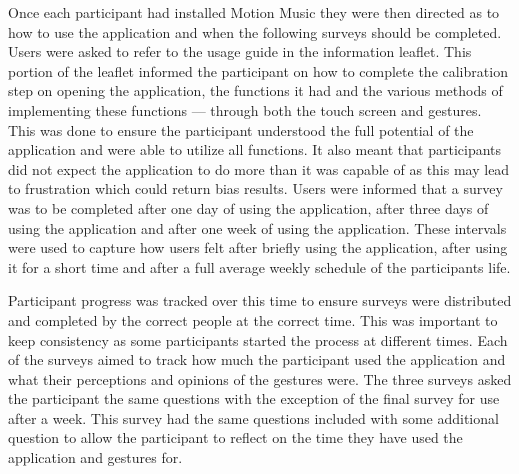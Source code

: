 \documentclass{l4proj}
\begin{document}
Once each participant had installed Motion Music they were then directed as to how to use the application and when the following surveys should be completed. Users were asked to refer to the usage guide in the information leaflet. This portion of the leaflet informed the participant on how to complete the calibration step on opening the application, the functions it had and the various methods of implementing these functions --- through both the touch screen and gestures. This was done to ensure the participant understood the full potential of the application and were able to utilize all functions. It also meant that participants did not expect the application to do more than it was capable of as this may lead to frustration which could return bias results. Users were informed that a survey was to be completed after one day of using the application, after three days of using the application and after one week of using the application. These intervals were used to capture how users felt after briefly using the application, after using it for a short time and after a full average weekly schedule of the participants life. 

Participant progress was tracked over this time to ensure surveys were distributed and completed by the correct people at the correct time. This was important to keep consistency as some participants started the process at different times. Each of the surveys aimed to track how much the participant used the application and what their perceptions and opinions of the gestures were. The three surveys asked the participant the same questions with the exception of the final survey for use after a week. This survey had the same questions included with some additional question to allow the participant to reflect on the time they have used the application and gestures for.
\end{document}
